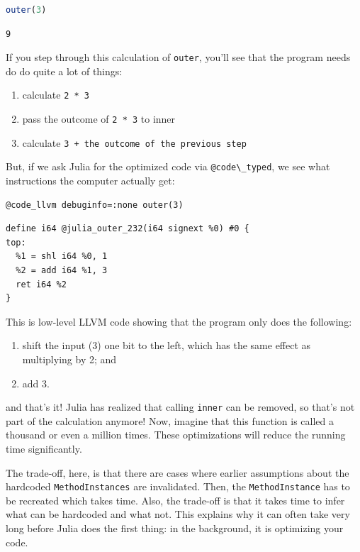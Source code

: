 \documentclass[
  notoc %
]{tufte-book}
\providecommand{\tightlist}{%
  \setlength{\itemsep}{0pt}\setlength{\parskip}{0pt}
}
\newcommand{\passthrough}[1]{#1}
\begin{document}
\begin{lstlisting}[language=Julia]
outer(3)
\end{lstlisting}

\begin{lstlisting}[language=Output]
9
\end{lstlisting}

If you step through this calculation of \passthrough{\lstinline!outer!},
you'll see that the program needs do do quite a lot of things:

\begin{enumerate}
\def\labelenumi{\arabic{enumi}.}
\tightlist
\item
  calculate \passthrough{\lstinline!2 * 3!}
\item
  pass the outcome of \passthrough{\lstinline!2 * 3!} to inner
\item
  calculate
  \passthrough{\lstinline!3 + the outcome of the previous step!}
\end{enumerate}

But, if we ask Julia for the optimized code via
\passthrough{\lstinline!@code\_typed!}, we see what instructions the
computer actually get:

\begin{lstlisting}
@code_llvm debuginfo=:none outer(3)
\end{lstlisting}

\begin{lstlisting}[language=Output]
define i64 @julia_outer_232(i64 signext %0) #0 {
top:
  %1 = shl i64 %0, 1
  %2 = add i64 %1, 3
  ret i64 %2
}
\end{lstlisting}

This is low-level LLVM code showing that the program only does the
following:

\begin{enumerate}
\def\labelenumi{\arabic{enumi}.}
\tightlist
\item
  shift the input (3) one bit to the left, which has the same effect as
  multiplying by 2; and
\item
  add 3.
\end{enumerate}

and that's it! Julia has realized that calling
\passthrough{\lstinline!inner!} can be removed, so that's not part of
the calculation anymore! Now, imagine that this function is called a
thousand or even a million times. These optimizations will reduce the
running time significantly.

The trade-off, here, is that there are cases where earlier assumptions
about the hardcoded \passthrough{\lstinline!MethodInstances!} are
invalidated. Then, the \passthrough{\lstinline!MethodInstance!} has to
be recreated which takes time. Also, the trade-off is that it takes time
to infer what can be hardcoded and what not. This explains why it can
often take very long before Julia does the first thing: in the
background, it is optimizing your code.
\end{document}
